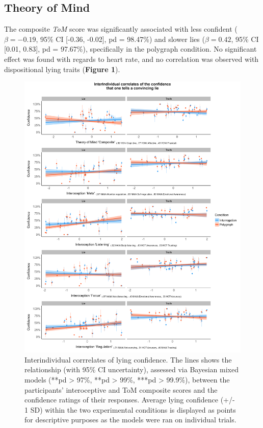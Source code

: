 \documentclass[
  man,mask,floatsintext]{apa6}
\begin{document}
\hypertarget{theory-of-mind}{%
\subsection{Theory of Mind}\label{theory-of-mind}}

The composite \emph{ToM} score was significantly associated with less confident (\(\beta=-0.19\), 95\% CI {[}-0.36, -0.02{]}, pd = 98.47\%) and slower lies (\(\beta=0.42\), 95\% CI {[}0.01, 0.83{]}, pd = 97.67\%), specifically in the polygraph condition. No significant effect was found with regards to heart rate, and no correlation was observed with dispositional lying traits (\textbf{Figure 1}).

\begin{figure}
\includegraphics[width=1\linewidth]{../figures/figure1} \caption{Interindividual corrrelates of lying confidence. The lines shows the relationship (with 95\% CI uncertainty), assessed via Bayesian mixed models (\***pd > 97\%, \***pd > 99\%, \****pd > 99.9\%), between the participants' interoceptive and ToM composite scores and the confidence ratings of their responses. Average lying confidence (+/- 1 SD) within the two experimental conditions is displayed as points for descriptive purposes as the models were ran on individual trials.}\label{fig:unnamed-chunk-1}
\end{figure}
\end{document}
